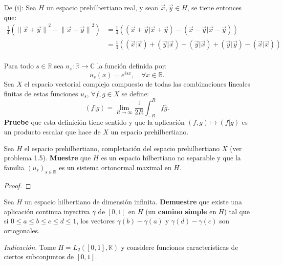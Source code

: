 \documentclass[12pt]{report}
\theoremstyle{largebreak}
\newcommand\cf[3]{\ensuremath{#1:#2\rightarrow#3}}
\newcommand\pint[2]{\ensuremath{\left(#1\big|#2\right)}}
\newcommand\conj[1]{\ensuremath{\overline{#1}}}
\newcommand\norm[1]{\ensuremath{\|#1\|}}
\begin{document}
    \begin{sol}
        De (i): Sea $H$ un espacio prehilbertiano real, y sean $\vec{x},\vec{y}\in H$, se tiene entonces que:
        \begin{equation*}
            \begin{split}
                \frac{1}{4}\left(\norm{\vec{x}+\vec{y}}^2-\norm{\vec{x}-\vec{y}}^2 \right)
                &=\frac{1}{4}\left(\pint{\vec{x}+\vec{y}}{\vec{x}+\vec{y}}-\pint{\vec{x}-\vec{y}}{\vec{x}-\vec{y}} \right) \\
                &=\frac{1}{4}\left(\pint{\vec{x}}{\vec{x}}+\pint{\vec{y}}{\vec{x}}+\pint{\vec{y}}{\vec{x}}+\pint{\vec{y}}{\vec{y}}-\pint{\vec{x}}{\vec{x}} \right) \\
            \end{split}
        \end{equation*}
    \end{sol}

    \begin{excer}
        Para todo $s\in\mathbb{R}$ sea $\cf{u_s}{\mathbb{R}}{\mathbb{C}}$ la función definida por:
        \begin{equation*}
            u_s(x)=e^{isx},\quad\forall x\in\mathbb{R}.
        \end{equation*}
        Sea $X$ el espacio vectorial complejo compuesto de todas las combinaciones lineales finitas de estas funciones $u_s$, $\forall f,g\in X$ se define:
        \begin{equation*}
            \pint{f}{g}=\lim_{R\rightarrow\infty}\frac{1}{2R}\int_{-R}^Rf\conj{g}.
        \end{equation*}
        \textbf{Pruebe} que esta definición tiene sentido y que la aplicación $(f,g)\mapsto\pint{f}{g}$ es un producto escalar que hace de $X$ un espacio prehilbertiano.

        Sea $H$ el espacio prehilbertiano, completación del espacio prehilbertiano $X$ (ver problema 1.5). \textbf{Muestre} que $H$ es un espacio hilbertiano no separable y que la familia $\left(u_s\right)_{s\in\mathbb{R}}$ es un sistema ortonormal maximal en $H$.
    \end{excer}

    \begin{proof}
        
    \end{proof}

    \begin{excer}
        Sea $H$ un espacio hilbertiano de dimensión infinita. \textbf{Demuestre} que existe una aplicación continua inyectiva $\gamma$ de $[0,1]$ en $H$ (un \textbf{camino simple} en $H$) tal que si $0\leq a\leq b\leq c\leq d\leq 1$, los vectores $\gamma(b)-\gamma(a)$ y $\gamma(d)-\gamma(c)$ son ortogonales.

        \textit{Indicación.} Tome $H=L_2([0,1],\mathbb{K})$ y considere funciones características de ciertos subconjuntos de $[0,1]$.
    \end{excer}
\end{document}
